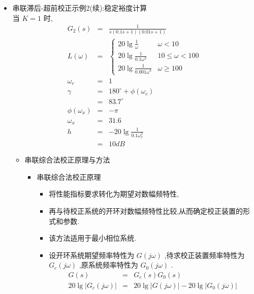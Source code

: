 \documentclass[table]{article}
\begin{document}
\begin{frame}
\begin{itemize}
\begin{itemize}
\begin{itemize}
\begin{itemize}
\item 串联滞后-超前校正示例2(续):稳定裕度计算\\
\label{sec-2-2-10-2-5-2-6}%
当  $K=1$  时, 
\begin{eqnarray*}
G_2(s) &=& \frac{1}{s(0.1s+1)(0.01s+1)} \\
L(\omega) & = & \begin{cases} 20\lg\frac{1}{\omega} & \omega<10 \\
                              20\lg\frac{1}{0.1\omega^2} & 10\leq \omega <100 \\
                              20\lg\frac{1}{0.001\omega^3} & \omega\geq 100  \end{cases}\\
\omega_c &=& 1 \\
\gamma &=& 180^{\circ}+\phi(\omega_c) \\
 &=& 83.7^{\circ} \\
\phi(\omega_x) &=& -\pi \\
\omega_x &=& 31.6\\
h &=& -20\lg\frac{1}{0.1\omega_x^2} \\
 &=& 10 dB
\end{eqnarray*}








\begin{itemize}

\item 串联综合法校正原理与方法
\label{sec-2-2-10-2-5-2-6-1}%
\begin{itemize}

\item 串联综合法校正原理
\label{sec-2-2-10-2-5-2-6-1-1}%
\begin{itemize}
\item <2->将性能指标要求转化为期望对数幅频特性,
\item <3->再与待校正系统的开环对数幅频特性比较,从而确定校正装置的形式和参数.
\item <4->该方法适用于最小相位系统.
\item <5->设开环系统期望频率特性为 $G(j\omega)$ ,待求校正装置频率特性为 $G_c(j\omega)$ ,原系统频率特性为 $G_0(j\omega)$ .
       	    \begin{eqnarray*}
       	    G(s) &= &G_c(s)G_0(s) \\
       	    20\lg|G_c(j\omega)| &=& 20\lg|G(j\omega)|-20\lg|G_0(j\omega)|
       	    \end{eqnarray*}
\end{itemize}


\end{itemize}
\end{itemize}
\end{itemize}
\end{itemize}
\end{itemize}
\end{itemize}
\end{frame}
\end{document}
